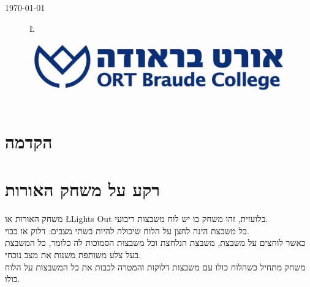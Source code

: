 \documentclass[12pt,twoside]{article}
\begin{document}
\begin{titlepage}
{\large \today}\\[2cm] %
\begin{figure}
	\begin{center}
		\L{\includegraphics[scale=0.3]{images/Braude_Logo.jpg}}
	\end{center}
\end{figure}


\vfill %

\end{titlepage}
\tableofcontents

\newpage
\section{הקדמה}

\section{רקע על משחק האורות}
משחק האורות או 
\L{Lights Out}
בלועזית,
זהו משחק בו יש לוח משבצות ריבועי.
\\
כל משבצת הינה לחצן על הלוח שיכולה להיות בשתי מצבים:
דלוק או כבוי.
\\
כאשר לוחצים על משבצת, משבצת הנלחצת וכל משבצות הסמוכות לה כלומר,
כל המשבצת בעל צלע משותפת משנות את מצב נוכחי.
\\
משחק מתחיל כשהלוח כולו עם משבצות דלוקות והמטרה לכבות את כל המשבצות על הלוח כולו.
\end{document}

